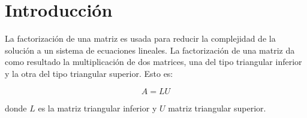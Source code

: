 \section{Introducción}

La factorización de una matriz es usada para reducir la complejidad de la solución a un sistema de ecuaciones lineales. La factorización de una matriz da como resultado la multiplicación de dos matrices, una del tipo triangular inferior y la otra del tipo triangular superior. Esto es:

\begin{equation}
    A=LU
\end{equation}

donde $L$ es la matriz triangular inferior y $U$ matriz triangular superior.